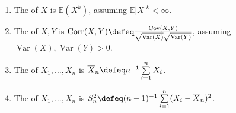 \begin{definition} \label{def:moments-correlation-and-sample-statistics} 
\begin{enumerate}[label=(\roman*)]
\setlength{\itemsep}{0pt}
\item The  of $X$ is $\mathbb{E}(X^k)$, assuming $\mathbb{E}|X|^k<\infty$.
\item The  of $X,Y$ is $\operatorname{Corr}(X,Y)\defeq\frac{\operatorname{Cov}(X,Y)}{\sqrt{\operatorname{Var}(X)}\sqrt{\operatorname{Var}(Y)}}$, assuming $\operatorname{Var}(X),\operatorname{Var}(Y)>0$.
\item The  of $X_1,\ldots,X_n$ is $\overline{X}_n\defeq n^{-1}\sum\limits_{i=1}^{n}X_i$.
\item The  of $X_1,\ldots,X_n$ is $S_n^2\defeq(n-1)^{-1}\sum\limits_{i=1}^{n}(X_i-\overline{X}_n)^2$.
\end{enumerate}
\end{definition}

